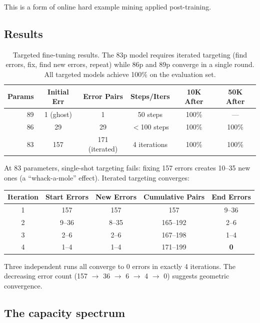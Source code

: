 \documentclass[11pt]{article}
\begin{document}
This is a form of online hard example mining
\citep{shrivastava2016training} applied post-training.

\subsection{Results}

\begin{table}[t]
\centering
\caption{Targeted fine-tuning results. The 83p model requires iterated
targeting (find errors, fix, find new errors, repeat) while 86p and 89p
converge in a single round. All targeted models achieve 100\% on the
evaluation set.}
\label{tab:targeted}
\vspace{4pt}
\begin{tabular}{@{}rccccc@{}}
\toprule
Params & Initial Err & Error Pairs & Steps/Iters & 10K After & 50K After \\
\midrule
89  & 1 (ghost) & 1            & 50 steps     & 100\% & --- \\
86  & 29        & 29           & $<$100 steps & 100\% & 100\% \\
83  & 157       & 171 (iterated) & 4 iterations & 100\% & 100\% \\
\bottomrule
\end{tabular}
\end{table}

At 83 parameters, single-shot targeting fails: fixing 157 errors creates
10--35 new ones (a ``whack-a-mole'' effect). Iterated targeting
converges:

\begin{center}
\begin{tabular}{ccccc}
\toprule
Iteration & Start Errors & New Errors & Cumulative Pairs & End Errors \\
\midrule
1 & 157  & 157  & 157  & 9--36 \\
2 & 9--36  & 8--35  & 165--192 & 2--6 \\
3 & 2--6   & 2--6   & 167--198 & 1--4 \\
4 & 1--4   & 1--4   & 171--199 & \textbf{0} \\
\bottomrule
\end{tabular}
\end{center}

Three independent runs all converge to 0 errors in exactly 4 iterations.
The decreasing error count (157 $\to$ 36 $\to$ 6 $\to$ 4 $\to$ 0)
suggests geometric convergence.

\subsection{The capacity spectrum}
\end{document}
